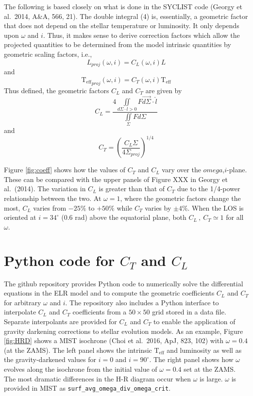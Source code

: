 \documentclass[12pt]{article}
\newcommand{\Teff}{\mathrm{T_{eff}}}
\begin{document}
The following is based closely on what is done in the SYCLIST code
(Georgy et al.\ 2014, A\&A, 566, 21). The double integral (4) is, essentially, a
geometric factor that does not depend on the stellar temperature or luminosity.
It only depends upon $\omega$ and $i$. Thus, it makes sense to derive correction
factors which allow the projected quantities to be determined from the model
intrinsic quantities by geometric scaling factors, i.e.,
\begin{equation}
  L_{proj}(\omega,i) = C_L(\omega,i) L
\end{equation}
and
\begin{equation}
  \Teff_{proj}(\omega,i) = C_T(\omega,i) \Teff
\end{equation}
Thus defined, the geometric factors $C_L$ and $C_T$ are given by
\begin{equation}
C_L = \frac{4 \iint\limits_{d\Sigma \cdot l > 0} F \vec{d\Sigma} \cdot \hat{l} }{\iint\limits_\Sigma F d\Sigma}
\end{equation}
and
\begin{equation}
C_T = \left( \frac{C_L \Sigma}{4 \Sigma_{proj}} \right)^{1/4}
\end{equation}

Figure \ref{fig:coeff} shows how the values of $C_T$ and $C_L$ vary over the
$omega$,$i$-plane. These can be compared with the upper panels of Figure XXX
in Georgy et al.\ (2014). The variation in $C_L$ is greater than that of $C_T$
due to the 1/4-power relationship between the two. At $\omega=1$, where
the geometric factors change the most, $C_L$ varies from $-25\%$ to
$+50\%$ while $C_T$ varies by $\pm4\%$. When the LOS is oriented at
$i=34^{\circ}$ ($0.6$ rad) above the equatorial plane, both $C_L~,~C_T \simeq 1$
for all $\omega$.

\section{Python code for $C_T$ and $C_L$}
The github repository provides Python code to numerically solve the differential equations in the ELR model
and to compute the geometric coefficients $C_L$ and $C_T$ for arbitrary $\omega$ and $i$. The repository
also includes a Python interface to interpolate $C_L$ and $C_T$ coefficients from a $50\times50$ grid
stored in a data file.  Separate interpolants are provided for $C_L$ and $C_T$ to enable the application
of gravity darkening corrections to stellar evolution models. As an example, Figure \ref{fig:HRD} shows
a MIST isochrone (Choi et al.\ 2016, ApJ, 823, 102) with $\omega=0.4$ (at the ZAMS). The left panel shows
the intrinsic $\Teff$ and luminosity as well as the gravity-darkened values for $i=0$ and $i=90^{\circ}$.
The right panel shows how $\omega$ evolves along the isochrone from the initial value of $\omega=0.4$ set
at the ZAMS. The most dramatic differences in the H-R diagram occur when $\omega$ is large. $\omega$ is
provided in MIST as \texttt{surf\_avg\_omega\_div\_omega\_crit}.
\end{document}
